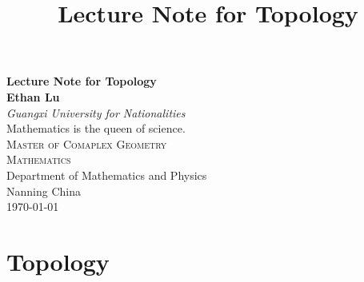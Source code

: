 \documentclass[oneside]{report}
\title{Lecture Note for Topology}
\theoremstyle{mytheoremstyle}
\theoremstyle{mytheoremstyle}
\theoremstyle{myproblemstyle}
\begin{document}
    \begin{titlepage}
\begin{center}
  {\huge\bfseries Lecture Note for Topology  
                  }                  \\[6.5ex]
  {\large\bfseries Ethan Lu}           \\
  \vspace{4ex}
  \vspace{5pt}
  \textit{Guangxi University for Nationalities}                \\[2cm]
  Mathematics is the queen of science. \\[2cm]
  \textsc{\Large Master of Comaplex Geometry}    \\[2ex]
  \textsc{\large Mathematics}             \\[12ex]
  \vfill
  Department of Mathematics and Physics              \\
  Nanning China                                 \\
  \vfill
  \today
\end{center}
\end{titlepage}
    \tableofcontents
    \pagestyle{main}
    \chapter{Topology}
\end{document}
